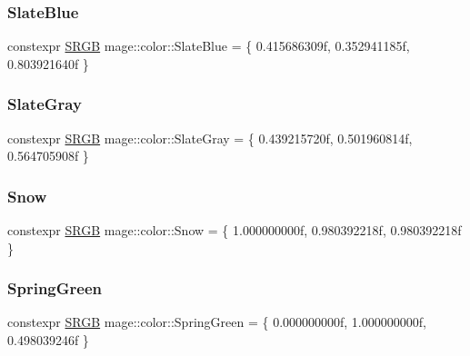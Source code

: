 \hypertarget{namespacemage_1_1color_addb1a03f77a6146fe2643fdff6fc5126}{}\label{namespacemage_1_1color_addb1a03f77a6146fe2643fdff6fc5126} 
\subsubsection{\texorpdfstring{Slate\+Blue}{SlateBlue}}
{\footnotesize\ttfamily constexpr \hyperlink{structmage_1_1_s_r_g_b}{S\+R\+GB} mage\+::color\+::\+Slate\+Blue = \{ 0.\+415686309f, 0.\+352941185f, 0.\+803921640f \}}

\hypertarget{namespacemage_1_1color_a5865dae79b0eff15705ab5f883e19178}{}\label{namespacemage_1_1color_a5865dae79b0eff15705ab5f883e19178} 
\subsubsection{\texorpdfstring{Slate\+Gray}{SlateGray}}
{\footnotesize\ttfamily constexpr \hyperlink{structmage_1_1_s_r_g_b}{S\+R\+GB} mage\+::color\+::\+Slate\+Gray = \{ 0.\+439215720f, 0.\+501960814f, 0.\+564705908f \}}

\hypertarget{namespacemage_1_1color_a91a2d603aba08879ab87e393244e8d84}{}\label{namespacemage_1_1color_a91a2d603aba08879ab87e393244e8d84} 
\subsubsection{\texorpdfstring{Snow}{Snow}}
{\footnotesize\ttfamily constexpr \hyperlink{structmage_1_1_s_r_g_b}{S\+R\+GB} mage\+::color\+::\+Snow = \{ 1.\+000000000f, 0.\+980392218f, 0.\+980392218f \}}

\hypertarget{namespacemage_1_1color_a10fed0e68980c7f4e10142709909c5b4}{}\label{namespacemage_1_1color_a10fed0e68980c7f4e10142709909c5b4} 
\subsubsection{\texorpdfstring{Spring\+Green}{SpringGreen}}
{\footnotesize\ttfamily constexpr \hyperlink{structmage_1_1_s_r_g_b}{S\+R\+GB} mage\+::color\+::\+Spring\+Green = \{ 0.\+000000000f, 1.\+000000000f, 0.\+498039246f \}}

